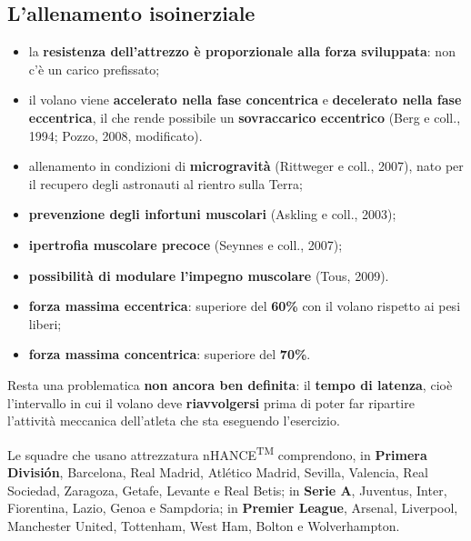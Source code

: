 \subsection{L'allenamento isoinerziale}

\begin{itemize}
  \item la \textbf{resistenza dell'attrezzo è proporzionale alla forza sviluppata}: non c'è un
    carico prefissato;
  \item il volano viene \textbf{accelerato nella fase concentrica} e \textbf{decelerato nella fase
    eccentrica}, il che rende possibile un \textbf{sovraccarico eccentrico} (Berg e coll., 1994;
    Pozzo, 2008, modificato).
\end{itemize}

\begin{itemize}
  \item allenamento in condizioni di \textbf{microgravità} (Rittweger e coll., 2007), nato per il
    recupero degli astronauti al rientro sulla Terra;
  \item \textbf{prevenzione degli infortuni muscolari} (Askling e coll., 2003);
  \item \textbf{ipertrofia muscolare precoce} (Seynnes e coll., 2007);
  \item \textbf{possibilità di modulare l'impegno muscolare} (Tous, 2009).
\end{itemize}

\begin{itemize}
  \item \textbf{forza massima eccentrica}: superiore del \textbf{60\%} con il volano rispetto ai
    pesi liberi;
  \item \textbf{forza massima concentrica}: superiore del \textbf{70\%}.
\end{itemize}

Resta una problematica \textbf{non ancora ben definita}: il \textbf{tempo di latenza}, cioè
l'intervallo in cui il volano deve \textbf{riavvolgersi} prima di poter far ripartire l'attività
meccanica dell'atleta che sta eseguendo l'esercizio.

Le squadre che usano attrezzatura nHANCE\textsuperscript{TM} comprendono, in \textbf{Primera
División}, Barcelona, Real Madrid, Atlético Madrid, Sevilla, Valencia, Real Sociedad, Zaragoza,
Getafe, Levante e Real Betis; in \textbf{Serie A}, Juventus, Inter, Fiorentina, Lazio, Genoa e
Sampdoria; in \textbf{Premier League}, Arsenal, Liverpool, Manchester United, Tottenham, West Ham,
Bolton e Wolverhampton.

